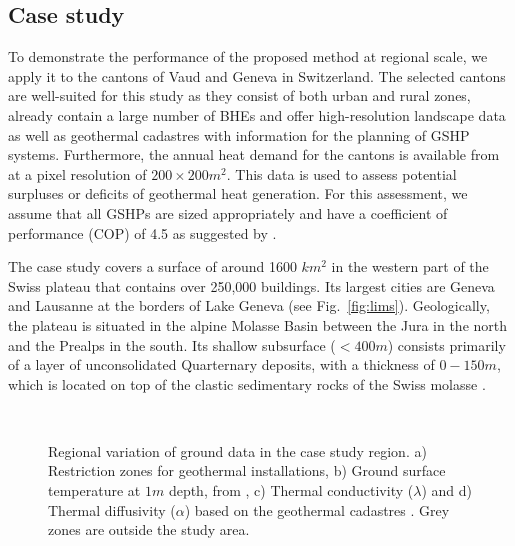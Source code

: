 \subsection{Case study}
\label{case_study}

To demonstrate the performance of the proposed method at regional scale, we apply it to the cantons of Vaud and Geneva in Switzerland. 
The selected cantons are well-suited for this study as they consist of both urban and rural zones, already contain a large number of BHEs
and offer high-resolution landscape data as well as geothermal cadastres with information for the planning of GSHP systems.
Furthermore, the annual heat demand for the cantons is available from \citet{schneider_spatialtemporal_2017} at a pixel resolution of $200 \times 200 m^2$. 
This data is used to assess potential surpluses or deficits of geothermal heat generation.
For this assessment, we assume that all GSHPs are sized appropriately and have a coefficient of performance (COP) of 4.5 as suggested by \citet{galgaro_empirical_2015}.

The case study covers a surface of around 1600 $km^2$ in the western part of the Swiss plateau that contains over 250,000 buildings. 
Its largest cities are Geneva and Lausanne at the borders of Lake Geneva (see Fig.~\ref{fig:lims}).
Geologically, the plateau is situated in the alpine Molasse Basin between the Jura in the north and the Prealps in the south. 
Its shallow subsurface ($< 400m$) consists primarily of a layer of unconsolidated Quarternary deposits, with a thickness of $0 - 150m$, which is located on top of the clastic sedimentary rocks of the Swiss molasse \cite{allenbach_geomol_2105}. %

\begin{figure}[!ht] %
\centering
{} \\
\caption{Regional variation of ground data in the case study region. a) Restriction zones for geothermal installations, b) Ground surface temperature at $1m$ depth, from \citet{assouline_machine_2019}, c) Thermal conductivity ($\lambda$) and d) Thermal diffusivity ($\alpha$) based on the geothermal cadastres \cite{asit_vd_cadastre_2019, sitg_cadastre_2019}. Grey zones are outside the study area.}
\label{fig:data}
\end{figure}

